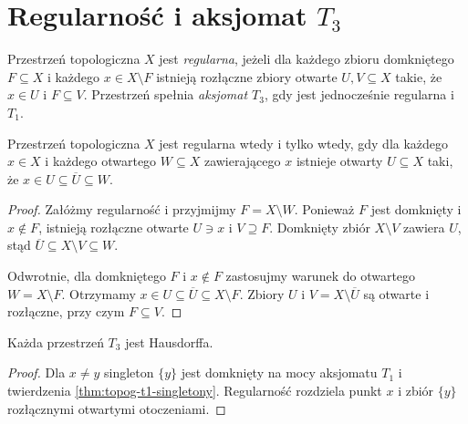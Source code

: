 \section{Regularność i aksjomat $T_3$}
\label{sec:topog-regularnosc}

\begin{definicja}
\label{def:topog-regularnosc-t3}
Przestrzeń topologiczna $X$ jest \emph{regularna}, jeżeli dla
każdego zbioru domkniętego $F\subseteq X$ i każdego $x\in X\setminus F$
istnieją rozłączne zbiory otwarte $U,V\subseteq X$ takie, że
$x\in U$ i $F\subseteq V$.
Przestrzeń spełnia \emph{aksjomat $T_3$}, gdy jest jednocześnie
regularna i $T_1$.
\end{definicja}

\begin{stwierdzenie}
\label{prop:topog-regularnosc-zwezanie}
Przestrzeń topologiczna $X$ jest regularna wtedy i tylko wtedy,
gdy dla każdego $x\in X$ i każdego otwartego $W\subseteq X$
zawierającego $x$ istnieje otwarty $U\subseteq X$ taki, że
$x\in U\subseteq\overline U\subseteq W$.
\end{stwierdzenie}
\begin{proof}
Załóżmy regularność i przyjmijmy $F=X\setminus W$.
Ponieważ $F$ jest domknięty i $x\notin F$, istnieją rozłączne
otwarte $U\ni x$ i $V\supseteq F$. Domknięty zbiór
$X\setminus V$ zawiera $U$, stąd
$\overline U\subseteq X\setminus V\subseteq W$.

Odwrotnie, dla domkniętego $F$ i $x\notin F$ zastosujmy warunek
do otwartego $W=X\setminus F$. Otrzymamy
$x\in U\subseteq\overline U\subseteq X\setminus F$.
Zbiory $U$ i $V=X\setminus\overline U$ są otwarte i rozłączne,
przy czym $F\subseteq V$.
\end{proof}

\begin{wniosek}
\label{cor:topog-t3-t2}
Każda przestrzeń $T_3$ jest Hausdorffa.
\end{wniosek}
\begin{proof}
Dla $x\ne y$ singleton $\{y\}$ jest domknięty na mocy
aksjomatu $T_1$ i twierdzenia \ref{thm:topog-t1-singletony}.
Regularność rozdziela punkt $x$ i zbiór $\{y\}$
rozłącznymi otwartymi otoczeniami.
\end{proof}

